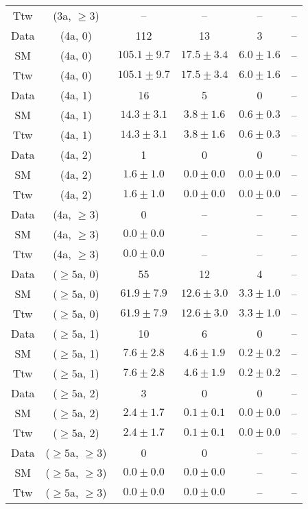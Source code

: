 \begin{table}[h!]
{\begin{tabular}{cccccc}
	Ttw & (3a, $\ge3$) & -- & -- & -- & -- \\[0.5ex] 
	Data & (4a, 0) & 112 & 13 & 3 & -- \\[0.5ex] 
	SM & (4a, 0) & $105.1\pm 9.7$ & $17.5\pm 3.4$ & $6.0\pm 1.6$ & -- \\[0.5ex] 
	Ttw & (4a, 0) & $105.1\pm 9.7$ & $17.5\pm 3.4$ & $6.0\pm 1.6$ & -- \\[0.5ex] 
	Data & (4a, 1) & 16 & 5 & 0 & -- \\[0.5ex] 
	SM & (4a, 1) & $14.3\pm 3.1$ & $3.8\pm 1.6$ & $0.6\pm 0.3$ & -- \\[0.5ex] 
	Ttw & (4a, 1) & $14.3\pm 3.1$ & $3.8\pm 1.6$ & $0.6\pm 0.3$ & -- \\[0.5ex] 
	Data & (4a, 2) & 1 & 0 & 0 & -- \\[0.5ex] 
	SM & (4a, 2) & $1.6\pm 1.0$ & $0.0\pm 0.0$ & $0.0\pm 0.0$ & -- \\[0.5ex] 
	Ttw & (4a, 2) & $1.6\pm 1.0$ & $0.0\pm 0.0$ & $0.0\pm 0.0$ & -- \\[0.5ex] 
	Data & (4a, $\ge3$) & 0 & -- & -- & -- \\[0.5ex] 
	SM & (4a, $\ge3$) & $0.0\pm 0.0$ & -- & -- & -- \\[0.5ex] 
	Ttw & (4a, $\ge3$) & $0.0\pm 0.0$ & -- & -- & -- \\[0.5ex] 
	Data & ($\ge5$a, 0) & 55 & 12 & 4 & -- \\[0.5ex] 
	SM & ($\ge5$a, 0) & $61.9\pm 7.9$ & $12.6\pm 3.0$ & $3.3\pm 1.0$ & -- \\[0.5ex] 
	Ttw & ($\ge5$a, 0) & $61.9\pm 7.9$ & $12.6\pm 3.0$ & $3.3\pm 1.0$ & -- \\[0.5ex] 
	Data & ($\ge5$a, 1) & 10 & 6 & 0 & -- \\[0.5ex] 
	SM & ($\ge5$a, 1) & $7.6\pm 2.8$ & $4.6\pm 1.9$ & $0.2\pm 0.2$ & -- \\[0.5ex] 
	Ttw & ($\ge5$a, 1) & $7.6\pm 2.8$ & $4.6\pm 1.9$ & $0.2\pm 0.2$ & -- \\[0.5ex] 
	Data & ($\ge5$a, 2) & 3 & 0 & 0 & -- \\[0.5ex] 
	SM & ($\ge5$a, 2) & $2.4\pm 1.7$ & $0.1\pm 0.1$ & $0.0\pm 0.0$ & -- \\[0.5ex] 
	Ttw & ($\ge5$a, 2) & $2.4\pm 1.7$ & $0.1\pm 0.1$ & $0.0\pm 0.0$ & -- \\[0.5ex] 
	Data & ($\ge5$a, $\ge3$) & 0 & 0 & -- & -- \\[0.5ex] 
	SM & ($\ge5$a, $\ge3$) & $0.0\pm 0.0$ & $0.0\pm 0.0$ & -- & -- \\[0.5ex] 
	Ttw & ($\ge5$a, $\ge3$) & $0.0\pm 0.0$ & $0.0\pm 0.0$ & -- & -- \\[0.5ex] 
	\hline
	\hline
\end{tabular}}
\end{table}
